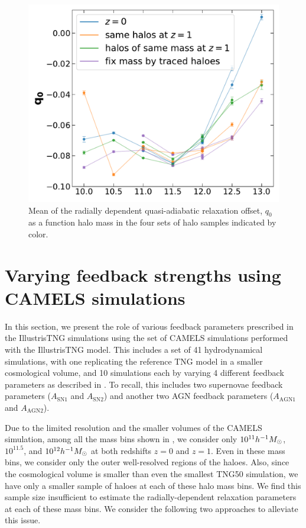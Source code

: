 \begin{figure}[htbp]
\centering
\includegraphics[width=0.6\linewidth]{plots/fit_param_q0_M_T_z01.pdf}
\caption{Mean of the radially dependent quasi-adiabatic relaxation offset, $q_{0}$ as a function halo mass in the four sets of halo samples indicated by color.}
\label{fig:fit-fit-func-q}
\end{figure}










\section{Varying feedback strengths using CAMELS simulations}
\label{sec:res-physvar-CAMELS}
In this section, we present the role of various feedback parameters prescribed in the IllustrisTNG simulations using the set of CAMELS simulations performed with the IllustrisTNG model. This includes a set of 41 hydrodynamical simulations, with one replicating the reference TNG model in a smaller cosmological volume, and 10 simulations each by varying 4 different feedback parameters as described in . To recall, this includes two supernovae feedback parameters ($A_{\mathrm{SN1}}$ and $A_{\mathrm{SN2}}$) and another two AGN feedback parameters ($A_{\mathrm{AGN1}}$ and $A_{\mathrm{AGN2}}$).

Due to the limited resolution and the smaller volumes of the CAMELS simulation, among all the mass bins shown in , we consider only $10^{11} h^{-1}M_{\odot}$, $10^{11.5}$, and $10^{12} h^{-1}M_{\odot}$ at both redshifts $z=0$ and $z=1$. Even in these mass bins, we consider only the outer well-resolved regions of the haloes. Also, since the cosmological volume is smaller than even the smallest TNG50 simulation, we have only a smaller sample of haloes at each of these halo mass bins. We find this sample size insufficient to estimate the radially-dependent relaxation parameters at each of these mass bins. We consider the following two approaches to alleviate this issue.

